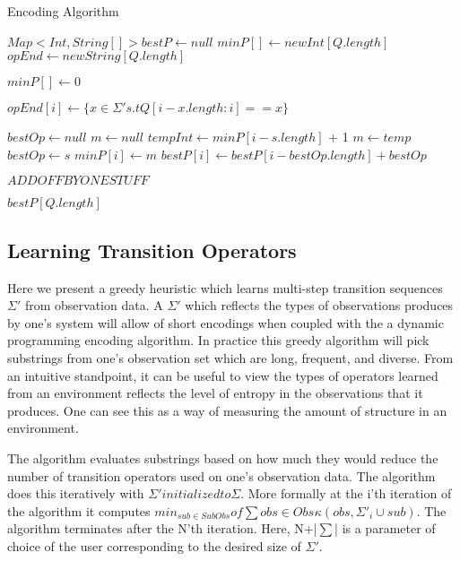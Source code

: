 \begin{algorithm}
\caption{Encoding Algorithm}
\label{Encoding Algorithm}
\begin{algorithmic}[1]

\State $Map<Int,String[]> bestP \gets null$
\State $minP[] \gets new Int[Q.length]$
\State $opEnd \gets new String[Q.length]$

\State $minP[] \gets 0$

	 $opEnd[i] \gets \{x \in \Sigma' s.t Q[i-x.length:i] == x\}$
\EndFor

	\State $bestOp \gets null$
	\State $m \gets null$ 
		\State $tempInt \gets minP[i-s.length]$ + 1
			\State $m \gets temp$ 
			\State $bestOp \gets s$
		\EndIf
	\EndFor
	\State $minP[i] \gets m$
	\State $bestP[i] \gets bestP[i-bestOp.length] + bestOp$
\EndFor

$ADD OFF BY ONE STUFF$

\Return $bestP[Q.length]$

\EndProcedure
\end{algorithmic}
\end{algorithm}

\subsection{Learning Transition Operators}

Here we present a greedy heuristic which learns multi-step transition sequences $\Sigma'$ from observation data. A $\Sigma'$ which reflects the types of observations produces by one's system will allow of short encodings when coupled with the a dynamic programming encoding algorithm. In practice this greedy algorithm will pick substrings from one's observation set which are long, frequent, and diverse. From an intuitive standpoint, it can be useful to view the types of operators learned from an environment reflects the level of entropy in the observations that it produces. One can see this as a way of measuring the amount of structure in an environment. 

The algorithm evaluates substrings based on how much they would reduce the number of transition operators used on one's observation data. The algorithm does this iteratively with $\Sigma' initialized to \Sigma$. More formally at the i'th iteration of the algorithm it computes $min_{sub \in SubObs} of \sum{obs \in Obs}^{}\kappa(obs,\Sigma'_i \cup sub)$. The algorithm terminates after the N'th iteration. Here, N+|$\sum$| is a parameter of choice of the user corresponding to the desired size of $\Sigma'$.

